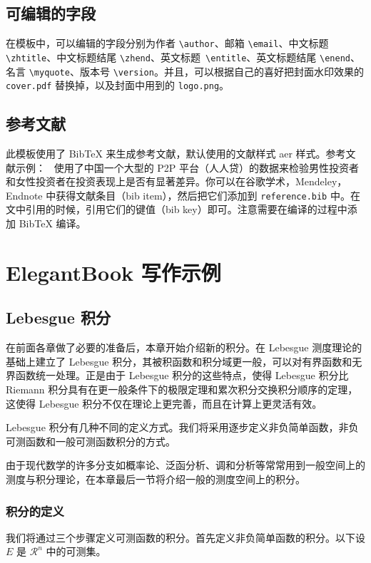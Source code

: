 \documentclass{elegantbook}
\begin{document}
\section{可编辑的字段}
在模板中，可以编辑的字段分别为作者 \verb|\author|、邮箱 \verb|\email|、中文标题 \verb|\zhtitle|、中文标题结尾 \verb|\zhend|、英文标题\verb| \entitle|、英文标题结尾 \verb|\enend|、名言 \verb|\myquote|、版本号 \verb|\version|。并且，可以根据自己的喜好把封面水印效果的 \verb|cover.pdf| 替换掉，以及封面中用到的 \verb|logo.png|。

\section{参考文献}

此模板使用了 Bib\TeX{} 来生成参考文献，默认使用的文献样式 aer 样式。参考文献示例：~\cite{Chen2018} 使用了中国一个大型的 P2P 平台（人人贷）的数据来检验男性投资者和女性投资者在投资表现上是否有显著差异。你可以在谷歌学术，Mendeley，Endnote 中获得文献条目（bib item），然后把它们添加到 \verb|reference.bib| 中。在文中引用的时候，引用它们的键值（bib key）即可。注意需要在编译的过程中添加 Bib\TeX{} 编译。

\chapter{ElegantBook 写作示例}

\section{Lebesgue 积分}
在前面各章做了必要的准备后，本章开始介绍新的积分。在 Lebesgue 测度理论的基础上建立了 Lebesgue 积分，其被积函数和积分域更一般，可以对有界函数和无界函数统一处理。正是由于 Lebesgue 积分的这些特点，使得 Lebesgue 积分比 Riemann 积分具有在更一般条件下的极限定理和累次积分交换积分顺序的定理，这使得 Lebesgue 积分不仅在理论上更完善，而且在计算上更灵活有效。

Lebesgue 积分有几种不同的定义方式。我们将采用逐步定义非负简单函数，非负可测函数和一般可测函数积分的方式。

由于现代数学的许多分支如概率论、泛函分析、调和分析等常常用到一般空间上的测度与积分理论，在本章最后一节将介绍一般的测度空间上的积分。

\subsection{积分的定义}

我们将通过三个步骤定义可测函数的积分。首先定义非负简单函数的积分。以下设 $E$ 是 $\mathcal{R}^n$ 中的可测集。
\end{document}
